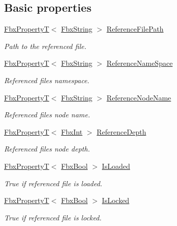 \subsection*{Basic properties}
\begin{DoxyCompactItemize}
\item 
\hyperlink{class_fbx_property_t}{Fbx\+PropertyT}$<$ \hyperlink{class_fbx_string}{Fbx\+String} $>$ \hyperlink{class_fbx_scene_reference_a782b9db13deb9ab4b1f5b1b48c4dbb0a}{Reference\+File\+Path}
\begin{DoxyCompactList}\small\item\em Path to the referenced file. \end{DoxyCompactList}\item 
\hyperlink{class_fbx_property_t}{Fbx\+PropertyT}$<$ \hyperlink{class_fbx_string}{Fbx\+String} $>$ \hyperlink{class_fbx_scene_reference_aa29e70b4a27c20a537c4daa567624821}{Reference\+Name\+Space}
\begin{DoxyCompactList}\small\item\em Referenced file\textquotesingle{}s namespace. \end{DoxyCompactList}\item 
\hyperlink{class_fbx_property_t}{Fbx\+PropertyT}$<$ \hyperlink{class_fbx_string}{Fbx\+String} $>$ \hyperlink{class_fbx_scene_reference_a322d144d3a3e9d641132c7f65c924c2b}{Reference\+Node\+Name}
\begin{DoxyCompactList}\small\item\em Referenced file\textquotesingle{}s node name. \end{DoxyCompactList}\item 
\hyperlink{class_fbx_property_t}{Fbx\+PropertyT}$<$ \hyperlink{fbxtypes_8h_a088fa96de3b0b3ea69f0f6afef525dfb}{Fbx\+Int} $>$ \hyperlink{class_fbx_scene_reference_a66ad8666d23493dc9e20cb7fa411963b}{Reference\+Depth}
\begin{DoxyCompactList}\small\item\em Referenced file\textquotesingle{}s node depth. \end{DoxyCompactList}\item 
\hyperlink{class_fbx_property_t}{Fbx\+PropertyT}$<$ \hyperlink{fbxtypes_8h_a92e0562b2fe33e76a242f498b362262e}{Fbx\+Bool} $>$ \hyperlink{class_fbx_scene_reference_a971731e9c034714443001ee94de52562}{Is\+Loaded}
\begin{DoxyCompactList}\small\item\em {\ttfamily True} if referenced file is loaded. \end{DoxyCompactList}\item 
\hyperlink{class_fbx_property_t}{Fbx\+PropertyT}$<$ \hyperlink{fbxtypes_8h_a92e0562b2fe33e76a242f498b362262e}{Fbx\+Bool} $>$ \hyperlink{class_fbx_scene_reference_a5b7de2086b4f2999c7473329e8887168}{Is\+Locked}
\begin{DoxyCompactList}\small\item\em {\ttfamily True} if referenced file is locked. \end{DoxyCompactList}\end{DoxyCompactItemize}
